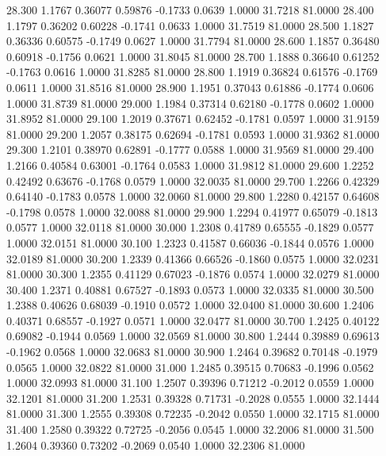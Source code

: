   28.300   1.1767   0.36077   0.59876  -0.1733   0.0639   1.0000  31.7218  81.0000
  28.400   1.1797   0.36202   0.60228  -0.1741   0.0633   1.0000  31.7519  81.0000
  28.500   1.1827   0.36336   0.60575  -0.1749   0.0627   1.0000  31.7794  81.0000
  28.600   1.1857   0.36480   0.60918  -0.1756   0.0621   1.0000  31.8045  81.0000
  28.700   1.1888   0.36640   0.61252  -0.1763   0.0616   1.0000  31.8285  81.0000
  28.800   1.1919   0.36824   0.61576  -0.1769   0.0611   1.0000  31.8516  81.0000
  28.900   1.1951   0.37043   0.61886  -0.1774   0.0606   1.0000  31.8739  81.0000
  29.000   1.1984   0.37314   0.62180  -0.1778   0.0602   1.0000  31.8952  81.0000
  29.100   1.2019   0.37671   0.62452  -0.1781   0.0597   1.0000  31.9159  81.0000
  29.200   1.2057   0.38175   0.62694  -0.1781   0.0593   1.0000  31.9362  81.0000
  29.300   1.2101   0.38970   0.62891  -0.1777   0.0588   1.0000  31.9569  81.0000
  29.400   1.2166   0.40584   0.63001  -0.1764   0.0583   1.0000  31.9812  81.0000
  29.600   1.2252   0.42492   0.63676  -0.1768   0.0579   1.0000  32.0035  81.0000
  29.700   1.2266   0.42329   0.64140  -0.1783   0.0578   1.0000  32.0060  81.0000
  29.800   1.2280   0.42157   0.64608  -0.1798   0.0578   1.0000  32.0088  81.0000
  29.900   1.2294   0.41977   0.65079  -0.1813   0.0577   1.0000  32.0118  81.0000
  30.000   1.2308   0.41789   0.65555  -0.1829   0.0577   1.0000  32.0151  81.0000
  30.100   1.2323   0.41587   0.66036  -0.1844   0.0576   1.0000  32.0189  81.0000
  30.200   1.2339   0.41366   0.66526  -0.1860   0.0575   1.0000  32.0231  81.0000
  30.300   1.2355   0.41129   0.67023  -0.1876   0.0574   1.0000  32.0279  81.0000
  30.400   1.2371   0.40881   0.67527  -0.1893   0.0573   1.0000  32.0335  81.0000
  30.500   1.2388   0.40626   0.68039  -0.1910   0.0572   1.0000  32.0400  81.0000
  30.600   1.2406   0.40371   0.68557  -0.1927   0.0571   1.0000  32.0477  81.0000
  30.700   1.2425   0.40122   0.69082  -0.1944   0.0569   1.0000  32.0569  81.0000
  30.800   1.2444   0.39889   0.69613  -0.1962   0.0568   1.0000  32.0683  81.0000
  30.900   1.2464   0.39682   0.70148  -0.1979   0.0565   1.0000  32.0822  81.0000
  31.000   1.2485   0.39515   0.70683  -0.1996   0.0562   1.0000  32.0993  81.0000
  31.100   1.2507   0.39396   0.71212  -0.2012   0.0559   1.0000  32.1201  81.0000
  31.200   1.2531   0.39328   0.71731  -0.2028   0.0555   1.0000  32.1444  81.0000
  31.300   1.2555   0.39308   0.72235  -0.2042   0.0550   1.0000  32.1715  81.0000
  31.400   1.2580   0.39322   0.72725  -0.2056   0.0545   1.0000  32.2006  81.0000
  31.500   1.2604   0.39360   0.73202  -0.2069   0.0540   1.0000  32.2306  81.0000
